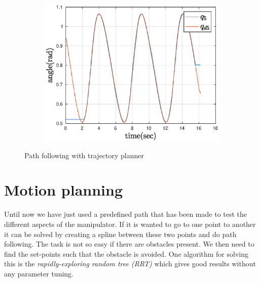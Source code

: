 \begin{figure}[htbp]
\begin{subfigure}[htbp]{0.45\textwidth}
        \includegraphics[width = \picsSiz\linewidth]{img/pathF5ff.eps}
        \caption{ }
    \end{subfigure}
    \caption{Path following with trajectory planner}
    \label{fig:pathTSff}
\end{figure}
\newpage

\section{Motion planning}
Until now we have just used a predefined path that has been made to test the different aspects of the manipulator. If it is wanted to go to one point to another it can be solved by creating a spline between these two points and do path following\cite{Spline,MatlabSpline2,MatlabSpline}. The task is not so easy if there are obstacles present. We then need to find the set-points such that the obstacle is avoided. One algorithm for solving this is the \textit{rapidly-exploring random tree (RRT)} which gives good results without any parameter tuning\cite{Lavalle}. 

